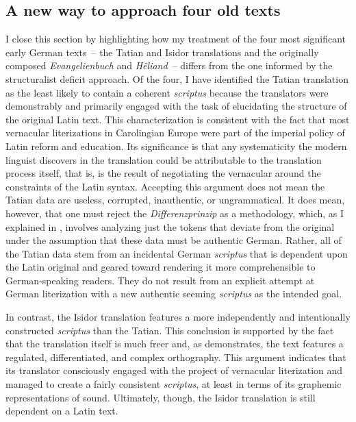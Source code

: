 \subsection{A new way to approach four old texts}\label{sec:3:3.1.3}

I close this section by highlighting how my treatment of the four most significant early German texts~-- the Tatian and Isidor translations and the originally composed \textit{Evangelienbuch} and \textit{Hêliand}~-- differs from the one informed by the structuralist deficit approach. Of the four, I have identified the Tatian translation as the least likely to contain a coherent \textit{scriptus} because the translators were demonstrably and primarily engaged with the task of elucidating the structure of the original Latin text. This characterization is consistent with the fact that most vernacular literizations in Carolingian Europe were part of the imperial policy of Latin reform and education. Its significance is that any systematicity the modern linguist discovers in the translation could be attributable to the translation process itself, that is, is the result of negotiating the vernacular around the constraints of the Latin syntax. Accepting this argument does not mean the Tatian data are useless, corrupted, inauthentic, or ungrammatical. It does mean, however, that one must reject the \textit{Differenzprinzip} as a methodology, which, as I explained in , involves analyzing just the tokens that deviate from the original under the assumption that these data must be authentic German. Rather, all of the Tatian data stem from an incidental German \textit{scriptus} that is dependent upon the Latin original and geared toward rendering it more comprehensible to German-speaking readers. They do not result from an explicit attempt at German literization with a new authentic seeming \textit{scriptus} as the intended goal.

In contrast, the Isidor translation features a more independently and intentionally constructed \textit{scriptus} than the Tatian. This conclusion is supported by the fact that the translation itself is much freer and, as \citet{Matzel1970} demonstrates, the text features a regulated, differentiated, and complex orthography. This argument indicates that its translator consciously engaged with the project of vernacular literization and managed to create a fairly consistent \textit{scriptus}, at least in terms of its graphemic representations of sound. Ultimately, though, the Isidor translation is still dependent on a Latin text.

